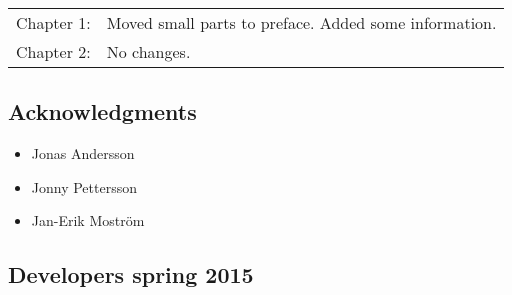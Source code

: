 \begin{tabular}{ll}
	Chapter 1: & Moved small parts to preface. Added some information. \\
	Chapter 2: & No changes.
\end{tabular}

\subsection*{Acknowledgments}
\begin{itemize}
	\item Jonas Andersson
	\item Jonny Pettersson
	\item Jan-Erik Moström
\end{itemize}


\subsection*{Developers spring 2015}\vspace*{-10pt}
